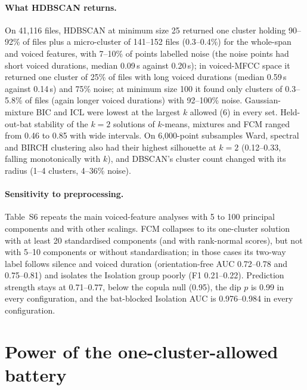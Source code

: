 \documentclass[11pt]{article}
\begin{document}
\paragraph{What HDBSCAN returns.} On 41,116 files, HDBSCAN at minimum size 25 returned one cluster holding 90--92\% of files plus a micro-cluster of 141--152 files (0.3--0.4\%) for the whole-span and voiced features, with 7--10\% of points labelled noise (the noise points had short voiced durations, median 0.09\,s against 0.20\,s); in voiced-MFCC space it returned one cluster of 25\% of files with long voiced durations (median 0.59\,s against 0.14\,s) and 75\% noise; at minimum size 100 it found only clusters of 0.3--5.8\% of files (again longer voiced durations) with 92--100\% noise. Gaussian-mixture BIC and ICL were lowest at the largest $k$ allowed (6) in every set. Held-out-bat stability of the $k=2$ solutions of $k$-means, mixtures and FCM ranged from 0.46 to 0.85 with wide intervals. On 6,000-point subsamples Ward, spectral and BIRCH clustering also had their highest silhouette at $k=2$ (0.12--0.33, falling monotonically with $k$), and DBSCAN's cluster count changed with its radius (1--4 clusters, 4--36\% noise).

\paragraph{Sensitivity to preprocessing.} Table~S6 repeats the main voiced-feature analyses with 5 to 100 principal components and with other scalings. FCM collapses to its one-cluster solution with at least 20 standardised components (and with rank-normal scores), but not with 5--10 components or without standardisation; in those cases its two-way label follows silence and voiced duration (orientation-free AUC 0.72--0.78 and 0.75--0.81) and isolates the Isolation group poorly (F1 0.21--0.22). Prediction strength stays at 0.71--0.77, below the copula null (0.95), the dip $p$ is 0.99 in every configuration, and the bat-blocked Isolation AUC is 0.976--0.984 in every configuration.


\section{Power of the one-cluster-allowed battery}
\end{document}
